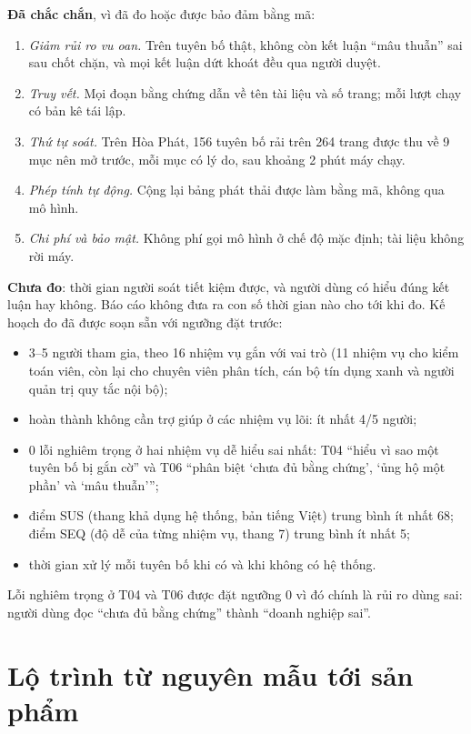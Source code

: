 \textbf{Đã chắc chắn}, vì đã đo hoặc được bảo đảm bằng mã:
\begin{enumerate}
\item \emph{Giảm rủi ro vu oan.} Trên tuyên bố thật, không còn kết luận “mâu thuẫn” sai sau chốt chặn, và mọi kết luận dứt khoát đều qua người duyệt.
\item \emph{Truy vết.} Mọi đoạn bằng chứng dẫn về tên tài liệu và số trang; mỗi lượt chạy có bản kê tái lập.
\item \emph{Thứ tự soát.} Trên Hòa Phát, 156 tuyên bố rải trên 264 trang được thu về 9 mục nên mở trước, mỗi mục có lý do, sau khoảng 2 phút máy chạy.
\item \emph{Phép tính tự động.} Cộng lại bảng phát thải được làm bằng mã, không qua mô hình.
\item \emph{Chi phí và bảo mật.} Không phí gọi mô hình ở chế độ mặc định; tài liệu không rời máy.
\end{enumerate}

\textbf{Chưa đo}: thời gian người soát tiết kiệm được, và người dùng có hiểu đúng kết luận hay không. Báo cáo không đưa ra con số thời gian nào cho tới khi đo. Kế hoạch đo đã được soạn sẵn với ngưỡng đặt trước:
\begin{itemize}
\item 3–5 người tham gia, theo 16 nhiệm vụ gắn với vai trò (11 nhiệm vụ cho kiểm toán viên, còn lại cho chuyên viên phân tích, cán bộ tín dụng xanh và người quản trị quy tắc nội bộ);
\item hoàn thành không cần trợ giúp ở các nhiệm vụ lõi: ít nhất 4/5 người;
\item 0 lỗi nghiêm trọng ở hai nhiệm vụ dễ hiểu sai nhất: T04 “hiểu vì sao một tuyên bố bị gắn cờ” và T06 “phân biệt ‘chưa đủ bằng chứng’, ‘ủng hộ một phần’ và ‘mâu thuẫn’”;
\item điểm SUS (thang khả dụng hệ thống, bản tiếng Việt) trung bình ít nhất 68; điểm SEQ (độ dễ của từng nhiệm vụ, thang 7) trung bình ít nhất 5;
\item thời gian xử lý mỗi tuyên bố khi có và khi không có hệ thống.
\end{itemize}
Lỗi nghiêm trọng ở T04 và T06 được đặt ngưỡng 0 vì đó chính là rủi ro dùng sai: người dùng đọc “chưa đủ bằng chứng” thành “doanh nghiệp sai”.

\section{Lộ trình từ nguyên mẫu tới sản phẩm}

